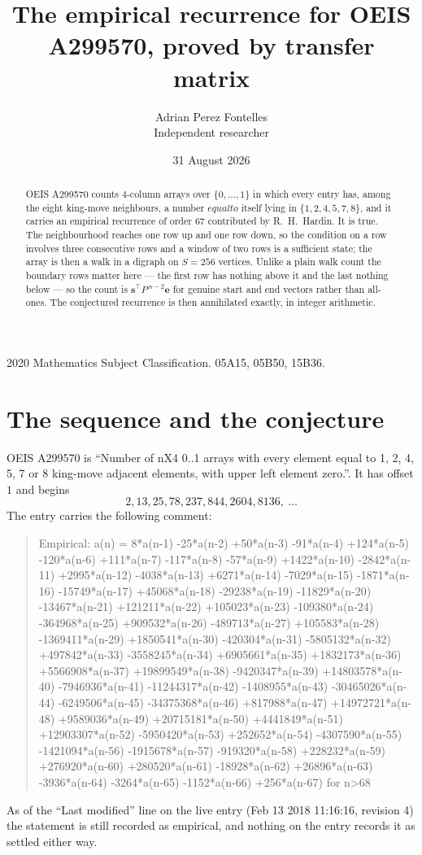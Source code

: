 \documentclass[11pt,a4paper]{article}
\title{The empirical recurrence for OEIS A299570, proved by transfer matrix}
\author{Adrian Perez Fontelles\\ \small Independent researcher}
\date{31 August 2026}
\theoremstyle{plain}
\theoremstyle{definition}
\begin{document}
\maketitle

\begin{abstract}
OEIS A299570 counts $4$-column arrays over $\{0,\dots,1\}$ in which every entry has,
among the eight king-move neighbours, a number $equal to$ itself lying in $\{1,2,4,5,7,8\}$, and it carries an empirical
recurrence of order $67$ contributed by R.~H.~Hardin. It is true. The neighbourhood
reaches one row up and one row down, so the condition on a row involves three consecutive
rows and a window of two rows is a sufficient state; the array is then a walk in a digraph
on $S=256$ vertices. Unlike a plain walk count the boundary rows matter here --- the first
row has nothing above it and the last nothing below --- so the count is
$\mathbf{s}^{\!\top}P^{\,n-2}\mathbf{e}$ for genuine start and end vectors rather than
all-ones. The conjectured recurrence is then annihilated exactly, in integer arithmetic.
\end{abstract}

\noindent\small 2020 Mathematics Subject Classification. 05A15, 05B50, 15B36.\normalsize

\section{The sequence and the conjecture}

OEIS A299570 is ``Number of nX4 0..1 arrays with every element equal to 1, 2, 4, 5, 7 or 8 king-move adjacent elements, with upper left element zero.''. It has offset
$1$ and begins
\[
2, 13, 25, 78, 237, 844, 2604, 8136,\ \dots
\]
The entry carries the following comment:
\begin{quote}\small
Empirical: a(n) = 8*a(n-1) -25*a(n-2) +50*a(n-3) -91*a(n-4) +124*a(n-5) -120*a(n-6) +111*a(n-7) -117*a(n-8) -57*a(n-9) +1422*a(n-10) -2842*a(n-11) +2995*a(n-12) -4038*a(n-13) +6271*a(n-14) -7029*a(n-15) -1871*a(n-16) -15749*a(n-17) +45068*a(n-18) -29238*a(n-19) -11829*a(n-20) -13467*a(n-21) +121211*a(n-22) +105023*a(n-23) -109380*a(n-24) -364968*a(n-25) +909532*a(n-26) -489713*a(n-27) +105583*a(n-28) -1369411*a(n-29) +1850541*a(n-30) -420304*a(n-31) -5805132*a(n-32) +497842*a(n-33) -3558245*a(n-34) +6905661*a(n-35) +1832173*a(n-36) +5566908*a(n-37) +19899549*a(n-38) -9420347*a(n-39) +14803578*a(n-40) -7946936*a(n-41) -11244317*a(n-42) -1408955*a(n-43) -30465026*a(n-44) -6249506*a(n-45) -34375368*a(n-46) +817988*a(n-47) +14972721*a(n-48) +9589036*a(n-49) +20715181*a(n-50) +4441849*a(n-51) +12903307*a(n-52) -5950420*a(n-53) +252652*a(n-54) -4307590*a(n-55) -1421094*a(n-56) -1915678*a(n-57) -919320*a(n-58) +228232*a(n-59) +276920*a(n-60) +280520*a(n-61) -18928*a(n-62) +26896*a(n-63) -3936*a(n-64) -3264*a(n-65) -1152*a(n-66) +256*a(n-67) for n>68
\end{quote}
As of the ``Last modified'' line on the live entry (Feb 13 2018 11:16:16, revision
4) the statement is still recorded as empirical, and nothing on the entry
records it as settled either way.
\end{document}
